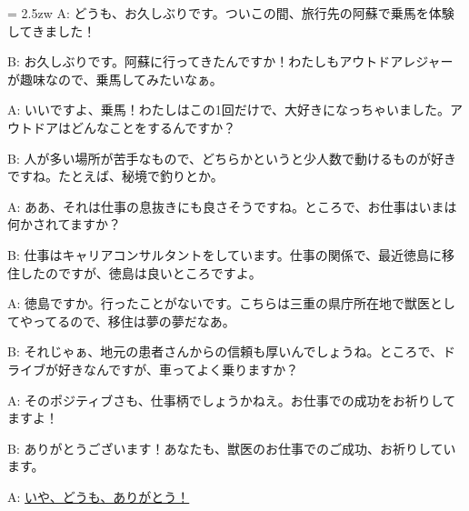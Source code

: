 \documentclass[11pt]{amsart}
\title{}
\author{}
\newenvironment{hangall}[1]{\hangindent = 2.5zw\everypar{\hangindent = 2.5zw}}{}
\begin{document}
\maketitle
\begin{hangall}{}%
A: どうも、お久しぶりです。ついこの間、旅行先の阿蘇で乗馬を体験してきました！

B: お久しぶりです。阿蘇に行ってきたんですか！わたしもアウトドアレジャーが趣味なので、乗馬してみたいなぁ。

A: いいですよ、乗馬！わたしはこの1回だけで、大好きになっちゃいました。アウトドアはどんなことをするんですか？

B: 人が多い場所が苦手なもので、どちらかというと少人数で動けるものが好きですね。たとえば、秘境で釣りとか。

A: ああ、それは仕事の息抜きにも良さそうですね。ところで、お仕事はいまは何かされてますか？

B: 仕事はキャリアコンサルタントをしています。仕事の関係で、最近徳島に移住したのですが、徳島は良いところですよ。

A: 徳島ですか。行ったことがないです。こちらは三重の県庁所在地で獣医としてやってるので、移住は夢の夢だなあ。

B: それじゃぁ、地元の患者さんからの信頼も厚いんでしょうね。ところで、ドライブが好きなんですが、車ってよく乗りますか？

A: そのポジティブさも、仕事柄でしょうかねえ。お仕事での成功をお祈りしてますよ！

B: ありがとうございます！あなたも、獣医のお仕事でのご成功、お祈りしています。

A: \ul{いや、どうも、ありがとう！}\end{hangall}
\end{document}
